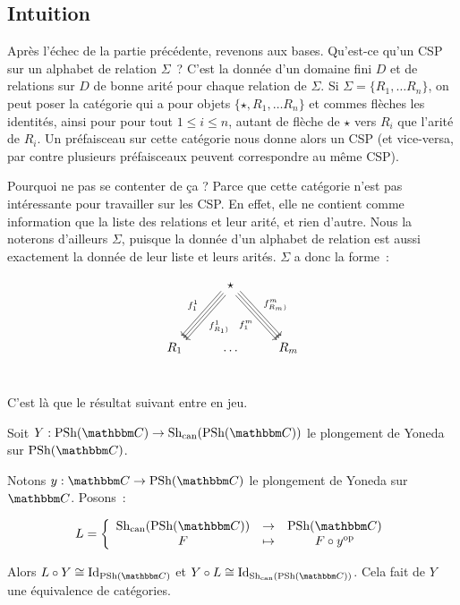 
\subsection{Intuition}

Après l'échec de la partie précédente, revenons aux bases. Qu'est-ce qu'un CSP
sur un alphabet de relation $\Sigma$~? C'est la donnée d'un domaine fini $D$ et
de relations sur $D$ de bonne arité pour chaque relation de $\Sigma$. Si
$\Sigma = \{R_1, \dots R_n\}$, on peut poser la catégorie qui a pour objets
$\{\star, R_1, \dots R_n\}$ et commes flèches les identités, ainsi pour pour
tout $1\leq i\leq n$, autant de flèche de $\star$ vers $R_i$ que l'arité de
$R_i$. Un préfaisceau sur cette catégorie nous donne alors un CSP (et
vice-versa, par contre plusieurs préfaisceaux peuvent correspondre au même
CSP).

Pourquoi ne pas se contenter de ça ? Parce que cette catégorie n'est pas
intéressante pour travailler sur les CSP. En effet, elle ne contient comme
information que la liste des relations et leur arité, et rien d'autre. Nous la
noterons d'ailleurs $\Sigma$, puisque la donnée d'un alphabet de relation est
aussi exactement la donnée de leur liste et leurs arités. $\Sigma$ a donc la forme~:

\[\begin{tikzcd}
    & \star \arrow[ddl, shift right, swap, "f_1^1"]
            \arrow[ddl]
            \arrow[ddl, shift left, "f_{\ar(R_1)}^1"] %
            \arrow[ddr, shift right, swap, "f_1^m"]
            \arrow[ddr]
            \arrow[ddr, shift left, "f_{\ar(R_m)}^m"]
            \\
    & & \\
    R_1 & \dots & R_m \\
\end{tikzcd}\]

C'est là que le résultat suivant entre en jeu.

\begin{prop}
    Soit $Y : \psh(\C)\rightarrow\shc(\psh(\C))$ le plongement de Yoneda sur
    $\psh(\C)$.

    Notons $y : \C\rightarrow\psh(\C)$ le plongement de Yoneda sur $\C$. Posons~:

    \[L = \left\{\begin{array}{ccc}
             \shc(\psh(\C)) & \rightarrow & \psh(\C) \\
             F              & \mapsto     & F\circ y^\text{op} \\
    \end{array}\right.\]

    Alors $L\circ Y\cong\text{Id}_{\psh(\C)}$ et
    $Y\circ L\cong\text{Id}_{\shc(\psh(\C))}$. Cela fait de $Y$ une équivalence de
    catégories.
\end{prop}

